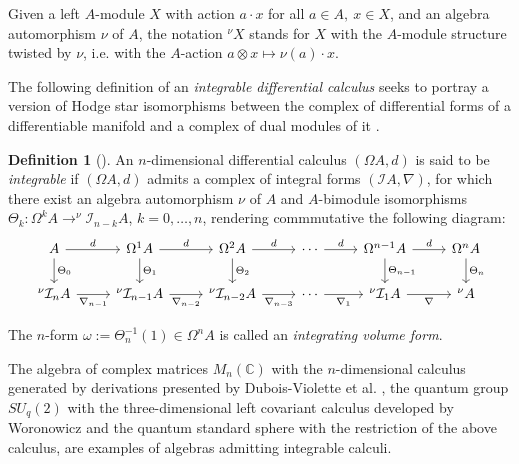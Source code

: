 \documentclass{amsart}
\theoremstyle{definition}
\newtheorem{definition}[theorem]{Definition}
\theoremstyle{remark}
\numberwithin{equation}{section}
\begin{document}
Given a left $A$-module $X$ with action $a\cdot x$ for all $a\in A,\ x \in X$, and an algebra automorphism $\nu$ of $A$, the notation $^{\nu}X$ stands for $X$ with the $A$-module structure twisted by $\nu$, i.e. with the $A$-action $a\otimes x \mapsto \nu(a)\cdot x $.

The following definition of an \textit{integrable differential calculus} seeks to portray a version of Hodge star isomorphisms between the complex of differential forms of a differentiable manifold and a complex of dual modules of it \cite[p. 112]{Brzezinski2015}. %

\begin{definition}[{\cite[Definition 2.1]{BrzezinskiSitarz2017}}]
An $n$-dimensional differential calculus $(\Omega A, d)$ is said to be {\em integrable} if $(\Omega A, d)$ admits a complex of integral forms $(\mathcal{I}A, \nabla)$, for which there exist an algebra automorphism $\nu$ of $A$ and $A$-bimodule isomorphisms \linebreak $\Theta_k: \Omega^{k} A \to ^{\nu} \mathcal{I}_{n-k}A$, $k = 0, \dotsc, n$, rendering commmutative the following diagram:
\[
\begin{tikzcd}
A \arrow{r}{d} \arrow{d}{\Theta_0} & \Omega^{1} A \arrow{d}{\Theta_1} \arrow{r}{d} & \Omega^2 A  \arrow{d}{\Theta_2} \arrow{r}{d} & \dotsb \arrow{r}{d} & \Omega^{n-1} A \arrow{d}{\Theta_{n-1}} \arrow{r}{d} & \Omega^n A  \arrow{d}{\Theta_n} \\ ^{\nu} \mathcal{I}_n A \arrow[swap]{r}{\nabla_{n-1}} & ^{\nu} \mathcal{I}_{n-1} A \arrow[swap]{r}{\nabla_{n-2}} & ^{\nu} \mathcal{I}_{n-2} A \arrow[swap]{r}{\nabla_{n-3}} & \dotsb \arrow[swap]{r}{\nabla_{1}} & ^{\nu} \mathcal{I}_{1} A \arrow[swap]{r}{\nabla} & ^{\nu} A
\end{tikzcd}
\]

The $n$-form $\omega:= \Theta_n^{-1}(1)\in \Omega^n A$ is called an {\em integrating volume form}. 
\end{definition}

The algebra of complex matrices $M_n(\mathbb{C})$ with the $n$-dimensional calculus generated by derivations presented by Dubois-Violette et al. \cite{DuboisViolette1988, DuboisVioletteKernerMadore1990}, the quantum group $SU_q(2)$ with the three-dimensional left covariant calculus developed by Woronowicz \cite{Woronowicz1987} and the quantum standard sphere with the restriction of the above calculus, are examples of algebras admitting integrable calculi. 
\end{document}
